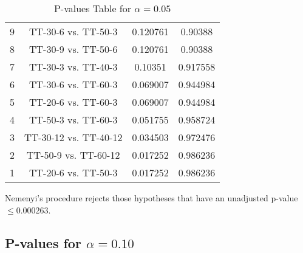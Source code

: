 \documentclass[a4paper,10pt]{article}
\begin{document}
\begin{landscape}
\begin{table}[!htp]
\begin{tabular}{cccc}
9&TT-30-6 vs. TT-50-3&0.120761&0.90388\\
8&TT-30-9 vs. TT-50-6&0.120761&0.90388\\
7&TT-30-3 vs. TT-40-3&0.10351&0.917558\\
6&TT-30-6 vs. TT-60-3&0.069007&0.944984\\
5&TT-20-6 vs. TT-60-3&0.069007&0.944984\\
4&TT-50-3 vs. TT-60-3&0.051755&0.958724\\
3&TT-30-12 vs. TT-40-12&0.034503&0.972476\\
2&TT-50-9 vs. TT-60-12&0.017252&0.986236\\
1&TT-20-6 vs. TT-50-3&0.017252&0.986236\\
\hline
\end{tabular}
\caption{P-values Table for $\alpha=0.05$}
\end{table}Nemenyi's procedure rejects those hypotheses that have an unadjusted p-value $\le0.000263$.

\pagebreak

\subsection{P-values for $\alpha=0.10$}


\end{landscape}
\end{document}
